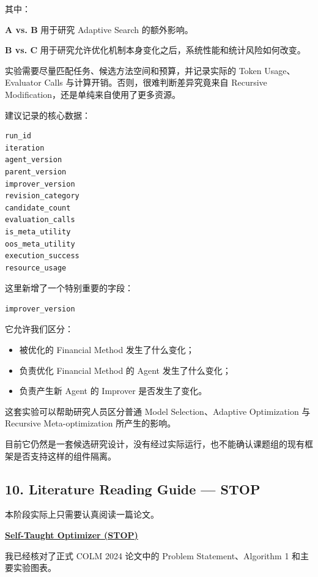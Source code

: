 其中：

\textbf{A vs. B} 用于研究 Adaptive Search 的额外影响。

\textbf{B vs. C} 用于研究允许优化机制本身变化之后，系统性能和统计风险如何改变。

实验需要尽量匹配任务、候选方法空间和预算，并记录实际的 Token Usage、Evaluator Calls 与计算开销。否则，很难判断差异究竟来自 Recursive Modification，还是单纯来自使用了更多资源。

建议记录的核心数据：

\begin{verbatim}
run_id
iteration
agent_version
parent_version
improver_version
revision_category
candidate_count
evaluation_calls
is_meta_utility
oos_meta_utility
execution_success
resource_usage
\end{verbatim}

这里新增了一个特别重要的字段：

\begin{verbatim}
improver_version
\end{verbatim}

它允许我们区分：

\begin{itemize}
\tightlist
\item
  被优化的 Financial Method 发生了什么变化；
\item
  负责优化 Financial Method 的 Agent 发生了什么变化；
\item
  负责产生新 Agent 的 Improver 是否发生了变化。
\end{itemize}

这套实验可以帮助研究人员区分普通 Model Selection、Adaptive Optimization 与 Recursive Meta-optimization 所产生的影响。

目前它仍然是一套候选研究设计，没有经过实际运行，也不能确认课题组的现有框架是否支持这样的组件隔离。

\hypertarget{part-3-37-0001-literature-reading-guide-stop}{%
\subsection{10. Literature Reading Guide --- STOP}\label{part-3-37-0001-literature-reading-guide-stop}}

本阶段实际上只需要认真阅读一篇论文。

\textbf{\href{https://proceedings.colm.cc/paper_files/paper/2024/hash/52eb24c316c78cc144dfa54f1f4bb4ec-Abstract-Conference.html}{Self-Taught Optimizer (STOP)}}

我已经核对了正式 COLM 2024 论文中的 Problem Statement、Algorithm 1 和主要实验图表。

